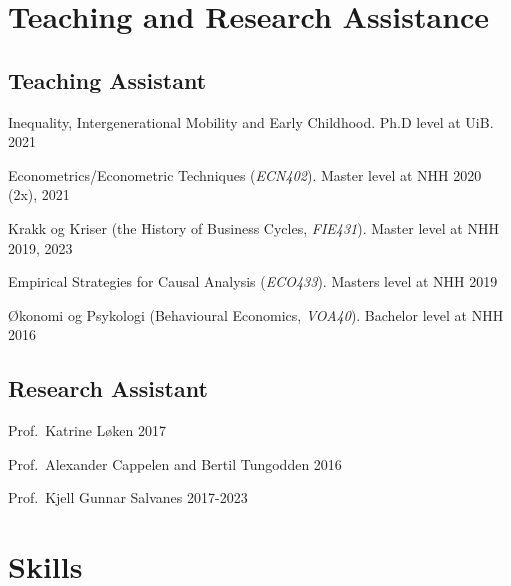 \documentclass[11pt,]{article}
\begin{document}
\vspace{0.5cm}

\hypertarget{teaching-and-research-assistance}{%
\section{Teaching and Research
Assistance}\label{teaching-and-research-assistance}}

\hypertarget{teaching-assistant}{%
\subsection{Teaching Assistant}\label{teaching-assistant}}

Inequality, Intergenerational Mobility and Early Childhood. Ph.D level
at UiB. \hfill 2021\vspace{-0.2cm}

Econometrics/Econometric Techniques (\emph{ECN402}). Master level at NHH
\hfill 2020 (2x), 2021\vspace{-0.2cm}

Krakk og Kriser (the History of Business Cycles, \emph{FIE431}). Master
level at NHH \hfill 2019, 2023\vspace{-0.2cm}

Empirical Strategies for Causal Analysis (\emph{ECO433}). Masters level
at NHH \hfill 2019\vspace{-0.2cm}

Økonomi og Psykologi (Behavioural Economics, \emph{VOA40}). Bachelor
level at NHH \hfill 2016\vspace{-0.2cm}

\vspace{0.5cm}

\hypertarget{research-assistant}{%
\subsection{Research Assistant}\label{research-assistant}}

Prof.~Katrine Løken \hfill 2017\vspace{-0.2cm}

Prof.~Alexander Cappelen and Bertil Tungodden \hfill 2016\vspace{-0.2cm}

Prof.~Kjell Gunnar Salvanes \hfill 2017-2023\vspace{-0.2cm}

\vspace{0.5cm}

\hypertarget{skills}{%
\section{Skills}\label{skills}}
\end{document}
